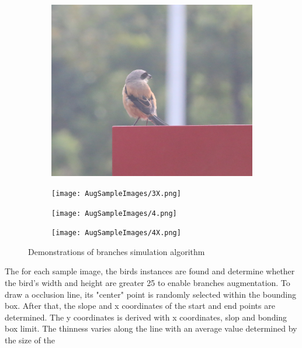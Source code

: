 \begin{figure}[H]
    \vspace{0.5em}
    \begin{subfigure}{0.20\textwidth}
        \includegraphics[width=\linewidth]{AugSampleImages/3.png}
    \end{subfigure}
    \begin{subfigure}{0.20\textwidth}
        \texttt{[image: AugSampleImages/3X.png]}
    \end{subfigure}

    \vspace{0.5em}
    \begin{subfigure}{0.20\textwidth}
        \texttt{[image: AugSampleImages/4.png]}
    \end{subfigure}
    \begin{subfigure}{0.20\textwidth}
        \texttt{[image: AugSampleImages/4X.png]}
    \end{subfigure}
    
    \caption{Demonstrations of branches simulation algorithm}
    \label{aug-exp}
\end{figure}
The for each sample image, the birds instances 
are found and determine whether the bird's 
width and height are greater 25 to enable branches 
augmentation. To draw a occlusion line, its "center" point
is randomly selected within the bounding box. After that, 
the slope and x coordinates of the start and end points 
are determined. The y coordinates is derived with x coordinates,
slop and bonding box limit. The thinness varies along 
the line with an average value determined by the size of the 
